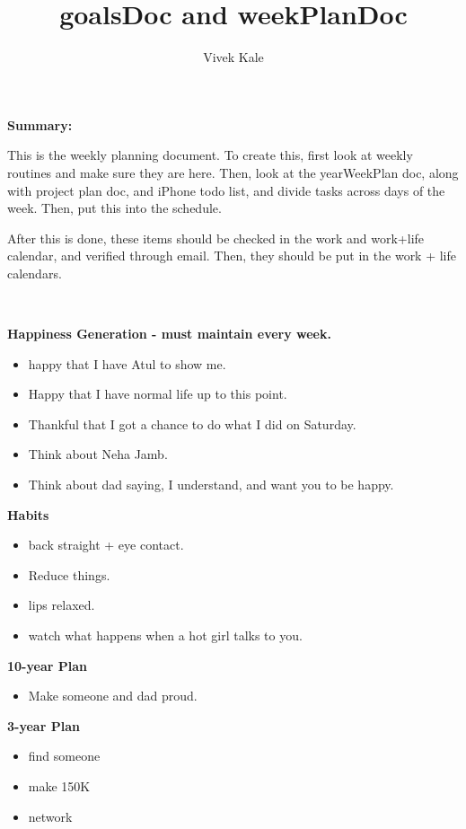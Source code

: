 \documentclass[11pt]{article}
\title{goalsDoc and weekPlanDoc}
\author{Vivek Kale}
\begin{document}
\maketitle  

\textbf{Summary:} {\small This is the weekly planning document. To create
this, first look at weekly routines and make sure they are here. Then,
look at the yearWeekPlan doc, along with project plan doc, and iPhone
todo list, and divide tasks across days of the week. Then, put this
into the schedule.

After this is done, these items should be checked in the work and
work+life calendar, and verified through email.
Then, they should be put in the work + life
calendars.}\\ 

\newpage 

\textbf{Happiness Generation - must maintain every week.}
\begin{itemize}
  \tiny \item \tiny happy that I have Atul to show me.
\item \tiny Happy that I have normal life up to this point.
\item \tiny Thankful that I got a chance to do what I did on Saturday.
\item \tiny Think about Neha Jamb.
\item \tiny Think about dad saying, I understand, and want you to be happy.
\end{itemize} 

\textbf{Habits}
\begin{itemize}
  \tiny \item \tiny back straight + eye contact.
\item \tiny Reduce things.
\item \tiny lips relaxed.
\item \tiny watch what happens when a hot girl talks to you.
\end{itemize} 
\newpage

\textbf{10-year Plan}
\begin{itemize}
\item \small Make someone and dad proud.
\end{itemize}
    
\textbf{3-year Plan} 
\begin{itemize} 
  \small \item \small find someone
\item \small make 150K
\item \small network
\end{itemize} 
\end{document}
